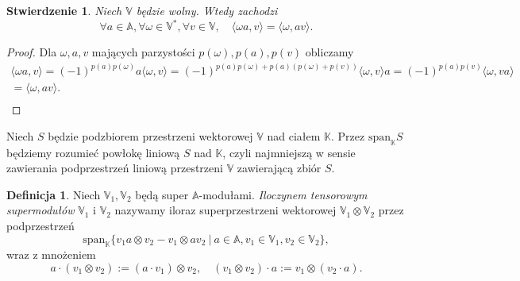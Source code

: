 \documentclass[11pt,a4paper]{report}
\newtheorem{proposition}[theorem]{Stwierdzenie}
\theoremstyle{definition}
\newtheorem{definition}[theorem]{Definicja}
\begin{document}
\begin{proposition}
	Niech $\mathbb{V}$ będzie wolny. Wtedy zachodzi
	\begin{equation}
		\label{supertransposition_component01}
		\forall a \in \mathbb{A}, \forall\omega \in \mathbb{V}^*, \forall v \in \mathbb{V}, \quad \langle \omega a, v \rangle = \langle \omega , a v \rangle.
	\end{equation}
\end{proposition}

\begin{proof}
	Dla $\omega, a, v$ mających parzystości $p(\omega), p(a), p(v)$ obliczamy 
	\begin{equation*}
		\begin{gathered}
			\langle \omega a , v \rangle = (-1)^{p(a)p(\omega)}a \langle \omega, v \rangle = (-1)^{p(a)p(\omega) + p(a)(p(\omega) + p(v))} \langle \omega, v \rangle a = (-1)^{p(a)p(v)} \langle \omega, v a\rangle \\ = \langle \omega, av \rangle. \\[-30pt]
		\end{gathered}
	\end{equation*}
\end{proof}

Niech $S$ będzie podzbiorem przestrzeni wektorowej $\mathbb{V}$ nad ciałem $\mathbb{K}$. Przez $\mathrm{span}_\mathbb{K} S$ będziemy rozumieć powłokę liniową $S$ nad $\mathbb{K}$, czyli najmniejszą w sensie zawierania podprzestrzeń liniową przestrzeni $\mathbb{V}$ zawierającą zbiór $S$.

\begin{definition}
	\label{def:tensor_supermodule}
	Niech $\mathbb{V}_1, \mathbb{V}_2$ będą super $\mathbb{A}$-modułami. \textit{Iloczynem tensorowym supermodułów} $\mathbb{V}_1$ i $\mathbb{V}_2$ nazywamy iloraz superprzestrzeni wektorowej $\mathbb{V}_1 \otimes \mathbb{V}_2$ przez podprzestrzeń
	\begin{equation*}
		\mathrm{span}_\mathbb{K} \{ v_1 a \otimes v_2 - v_1 \otimes a v_2\ |\ a \in \mathbb{A}, v_1 \in \mathbb{V}_1, v_2 \in \mathbb{V}_2 \},
	\end{equation*}
	wraz z mnożeniem
	\begin{equation*}
		a \cdot \left( v_1 \otimes v_2 \right) := (a \cdot v_1) \otimes v_2, \quad \left( v_1 \otimes v_2 \right) \cdot a := v_1 \otimes (v_2 \cdot a).
	\end{equation*}
\end{definition}
\end{document}
